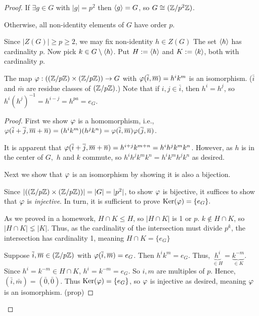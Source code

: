 \documentclass[notes.tex]{subfiles}
\begin{document}
\begin{proof}
	If $\exists g\in G$ with $|g| = p^2$ then $\left\langle{g}\right\rangle = G$, so $G\cong (\mathbb{Z}/{p^2}\mathbb{Z})$.

	Otherwise, all non-identity elements of $G$ have order $p$. 

	Since $|Z(G)| \ge p\ge 2$, we may fix non-identity $h\in Z(G)$ The set $\left\langle{h}\right\rangle$ has cardinality $p$. Now pick $k\in G\setminus \left\langle{h}\right\rangle$.
	Put $H := \left\langle{h}\right\rangle$ and $K := \left\langle{k}\right\rangle$, both with cardinality $p$.

	\begin{claim}
		The map $\varphi:((\mathbb{Z}/{p}\mathbb{Z})\times (\mathbb{Z}/{p}\mathbb{Z})) \to G$ with $\varphi(\overline{i}, \overline{m}) = h^ik^m$ is an isomorphism. ($\bar i$ and $\bar m$ are residue classes of $(\mathbb{Z}/{p}\mathbb{Z})$.) Note that if $i, j \in \bar i$, then $h^i = h^j$, so $h^i(h^j)^{-1} = h^{i-j} = h^{pa} = e_G$.
	\end{claim}
	\begin{proof}
		First we show $\varphi$ is a homomorphism, i.e., $\varphi(\overline{i} + \overline{j}, \overline{m} + \overline{n}) = (h^ik^m)(h^jk^n) = \varphi(\overline{i}, \overline{m})\varphi(\overline{j}, \overline{n})$.
			
		It is apparent that $\varphi(\overline{i} + \overline{j}, \overline{m} + \overline{n}) = h^{i+j}k^{m+n} = h^ih^jk^mk^n$. However, as $h$ is in the center of $G, $ $h$ and $k$ commute, so $h^ih^jk^mk^n = h^ik^mh^jk^n$ as desired.

		Next we show that $\varphi$ is an isomorphism by showing it is also a bijection.

		Since $|((\mathbb{Z}/{p}\mathbb{Z})\times (\mathbb{Z}/{p}\mathbb{Z}))| = |G| = |p^2|$, to show $\varphi$ is bijective, it suffices to show that $\varphi$ is \emph{injective}. In turn, it is sufficient to prove $\operatorname{\mathrm{Ker}}(\varphi) = \{e_G\}.$ 


			As we proved in a homework, $H\cap K \le H$, so $|H\cap K|$ is 1 or $p$.
			$k\notin H \cap K$, so $|H\cap K| \lneq |K|$. Thus, as the cardinality of the intersection must divide $p^k$, the intersection has cardinality 1, meaning $H\cap K = \{e_G\}$

		Suppose $\overline{i}, \overline{m} \in (\mathbb{Z}/{p}\mathbb{Z})$ with $\varphi(\overline{i}, \overline{m}) = e_G$. Then $h^ik^m = e_G$. Thus, $\underbrace{h^i}_{\in H} = \underbrace{k^{-m}}_{\in K}$.
		 Since $h^i = k^{-m}\in H\cap K$, $h^i = k^{-m} = e_G$. So $i, m$ are multiples of $p$. Hence, $(\bar i, \bar m) = (\bar 0, \bar 0)$. Thus $\operatorname{\mathrm{Ker}}(\varphi) = \{e_G\}$, so $\varphi$ is injective as desired, meaning $\varphi$ is an isomorphism. \qedhere(prop)
	\end{proof}
\end{proof}
\end{document}
